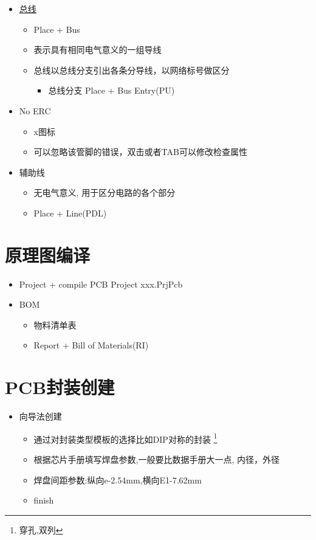 \documentclass[11pt]{article}
\begin{document}
\begin{itemize}
\begin{itemize}
\item Place Port
\item 其他作了解\footnote{Sheet Entry, Off Sheet Connector, Power Port}
\end{itemize}
\item \uline{总线}
\begin{itemize}
\item Place + Bus
\item 表示具有相同电气意义的一组导线
\item 总线以总线分支引出各条分导线，以网络标号做区分
\begin{itemize}
\item 总线分支 Place + Bus Entry(PU)
\end{itemize}
\end{itemize}
\item No ERC
\begin{itemize}
\item x图标
\item 可以忽略该管脚的错误，双击或者TAB可以修改检查属性
\end{itemize}
\item 辅助线
\begin{itemize}
\item 无电气意义, 用于区分电路的各个部分
\item Place + Line(PDL)
\end{itemize}
\end{itemize}
\section{原理图编译}
\label{sec:org145728b}
\begin{itemize}
\item Project + compile PCB Project xxx.PrjPcb
\item BOM
\begin{itemize}
\item 物料清单表
\item Report + Bill of Materials(RI)
\end{itemize}
\end{itemize}
\section{PCB封装创建}
\label{sec:orgd5bcdd1}
\begin{itemize}
\item 向导法创建
\begin{itemize}
\item 通过对封装类型模板的选择比如DIP对称的封装 \footnote{穿孔,双列}
\item 根据芯片手册填写焊盘参数,一般要比数据手册大一点, 内径，外径
\item 焊盘间距参数:纵向e-2.54mm,横向E1-7.62mm
\item finish
\end{itemize}
\end{itemize}
\end{document}
